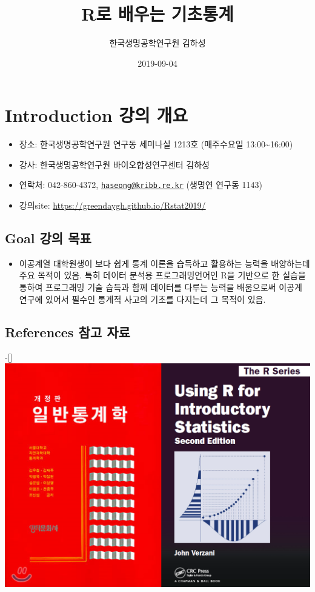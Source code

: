 \documentclass[]{book}
\title{R로 배우는 기초통계}
\author{한국생명공학연구원 김하성}
\date{2019-09-04}
\providecommand{\tightlist}{%
  \setlength{\itemsep}{0pt}\setlength{\parskip}{0pt}}
\begin{document}
\maketitle

{
\setcounter{tocdepth}{1}
\tableofcontents
}
\hypertarget{introduction--}{%
\chapter{Introduction 강의 개요}\label{introduction--}}

\begin{itemize}
\tightlist
\item
  장소: 한국생명공학연구원 연구동 세미나실 1213호 (매주수요일 13:00\textasciitilde{}16:00)
\item
  강사: 한국생명공학연구원 바이오합성연구센터 김하성
\item
  연락처: 042-860-4372, \href{mailto:haseong@kribb.re.kr}{\nolinkurl{haseong@kribb.re.kr}} (생명연 연구동 1143)
\item
  강의site: \url{https://greendaygh.github.io/Rstat2019/}
\end{itemize}

\hypertarget{goal--}{%
\section{Goal 강의 목표}\label{goal--}}

\begin{itemize}
\tightlist
\item
  이공계열 대학원생이 보다 쉽게 통계 이론을 습득하고 활용하는 능력을 배양하는데 주요 목적이 있음. 특히 데이터 분석용 프로그래밍언어인 R을 기반으로 한 실습을 통하여 프로그래밍 기술 습득과 함께 데이터를 다루는 능력을 배움으로써 이공계 연구에 있어서 필수인 통계적 사고의 기초를 다지는데 그 목적이 있음.
\end{itemize}

\hypertarget{references--}{%
\section{References 참고 자료}\label{references--}}

-{[}{]} \includegraphics{images/01-15.PNG}
\end{document}
